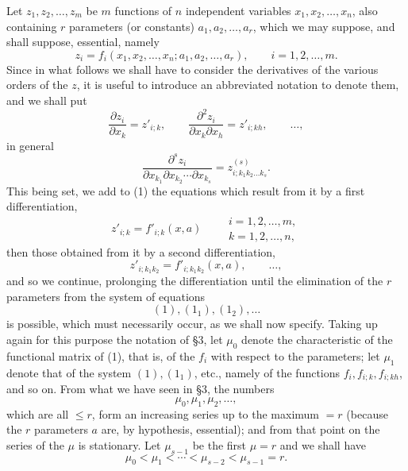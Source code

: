 \documentclass[11pt]{book}
\begin{document}
Let $z_1,z_2,\ldots,z_m$ be $m$ functions of $n$ independent variables $x_1,x_2,\ldots,x_n$, also containing $r$ parameters (or constants) $a_1,a_2,\ldots,a_r$, which we may suppose, and shall suppose, essential, namely
\begin{equation*}\tag{1}
 z_i=f_i(x_1,x_2,\ldots,x_n; a_1,a_2,\ldots,a_r),
 \qquad i=1,2,\ldots,m.
\end{equation*}
Since in what follows we shall have to consider the derivatives of the various orders of the $z$, it is useful to introduce an abbreviated notation to denote them, and we shall put
\[
 \frac{\partial z_i}{\partial x_k}=z'_{i;k},
 \qquad
 \frac{\partial^2 z_i}{\partial x_k\partial x_h}=z'_{i;kh},
 \qquad \ldots,
\]
in general
\[
 \frac{\partial^s z_i}{\partial x_{k_1}\partial x_{k_2}\cdots\partial x_{k_s}}
   =z^{(s)}_{i;k_1k_2\ldots k_s}.
\]
This being set, we add to (1) the equations which result from it by a first differentiation,
\begin{equation*}\tag{$1_1$}
 z'_{i;k}=f'_{i;k}(x,a)
 \qquad
 \begin{gathered}
 i=1,2,\ldots,m,\\
 k=1,2,\ldots,n,
 \end{gathered}
\end{equation*}
then those obtained from it by a second differentiation,
\begin{equation*}\tag{$1_2$}
 z'_{i;k_1k_2}=f'_{i;k_1k_2}(x,a),
 \qquad \ldots,
\end{equation*}
and so we continue, prolonging the differentiation until the elimination of the $r$ parameters from the system of equations
\[
 (1),(1_1),(1_2),\ldots
\]
is possible, which must necessarily occur, as we shall now specify. Taking up again for this purpose the notation of \S{}3, let $\mu_0$ denote the characteristic of the functional matrix of (1), that is, of the $f_i$ with respect to the parameters; let $\mu_1$ denote that of the system $(1),(1_1)$, etc., namely of the functions $f_i,f_{i;k},f_{i;kh}$, and so on. From what we have seen in \S{}3, the numbers
\[
 \mu_0,\mu_1,\mu_2,\ldots,
\]
which are all $\le r$, form an increasing series up to the maximum $=r$ (because the $r$ parameters $a$ are, by hypothesis, essential); and from that point on the series of the $\mu$ is stationary. Let $\mu_{s-1}$ be the first $\mu=r$ and we shall have
\[
 \mu_0<\mu_1<\cdots<\mu_{s-2}<\mu_{s-1}=r.
\]
\end{document}
